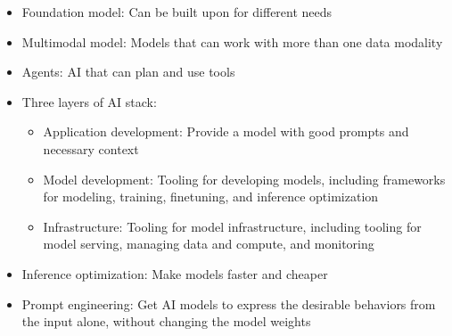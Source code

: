 \documentclass[11pt]{scrartcl}
\begin{document}
\begin{itemize}
\begin{itemize}
	\end{itemize}
	\item Foundation model: Can be built upon for different needs
	\item Multimodal model: Models that can work with more than one data modality
	\item Agents: AI that can plan and use tools
	\item Three layers of AI stack:
	\begin{itemize}
		\item Application development: Provide a model with good prompts and necessary context
		\item Model development: Tooling for developing models, including frameworks for modeling, training, finetuning, and inference optimization
		\item Infrastructure: Tooling for model infrastructure, including tooling for model serving, managing data and compute, and monitoring
	\end{itemize}
	\item Inference optimization: Make models faster and cheaper
	\item Prompt engineering: Get AI models to express the desirable behaviors from the input alone, without changing the model weights
\end{itemize}
\end{document}
